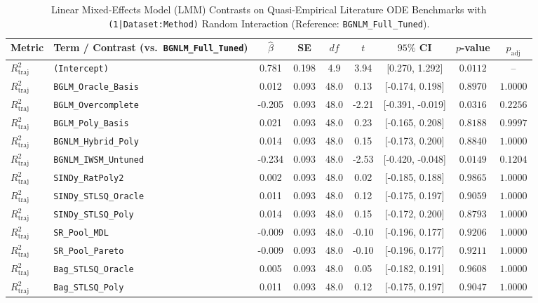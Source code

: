 \begin{table}[t]
\centering
\caption{Linear Mixed-Effects Model (LMM) Contrasts on Quasi-Empirical Literature ODE Benchmarks with \texttt{(1|Dataset:Method)} Random Interaction (Reference: \texttt{BGNLM\_Full\_Tuned}).}
\label{tab:mixed_effects_real}
\scriptsize
\setlength{\tabcolsep}{3.5pt}
\renewcommand{\arraystretch}{0.88}
\begin{tabular}{llccccccc}
\toprule
Metric & Term / Contrast (vs.\ \texttt{BGNLM\_Full\_Tuned}) & $\hat{\beta}$ & SE & $df$ & $t$ & $95\%$ CI & $p$-value & $p_{\text{adj}}$ \\
\midrule
$R^2_{\text{traj}}$ & \texttt{(Intercept)} & 0.781 & 0.198 & 4.9 & 3.94 & [0.270, 1.292] & $0.0112$ & -- \\
$R^2_{\text{traj}}$ & \texttt{BGLM\_Oracle\_Basis} & 0.012 & 0.093 & 48.0 & 0.13 & [-0.174, 0.198] & $0.8970$ & $1.0000$ \\
$R^2_{\text{traj}}$ & \texttt{BGLM\_Overcomplete} & -0.205 & 0.093 & 48.0 & -2.21 & [-0.391, -0.019] & $0.0316$ & $0.2256$ \\
$R^2_{\text{traj}}$ & \texttt{BGLM\_Poly\_Basis} & 0.021 & 0.093 & 48.0 & 0.23 & [-0.165, 0.208] & $0.8188$ & $0.9997$ \\
$R^2_{\text{traj}}$ & \texttt{BGNLM\_Hybrid\_Poly} & 0.014 & 0.093 & 48.0 & 0.15 & [-0.173, 0.200] & $0.8840$ & $1.0000$ \\
$R^2_{\text{traj}}$ & \texttt{BGNLM\_IWSM\_Untuned} & -0.234 & 0.093 & 48.0 & -2.53 & [-0.420, -0.048] & $0.0149$ & $0.1204$ \\
$R^2_{\text{traj}}$ & \texttt{SINDy\_RatPoly2} & 0.002 & 0.093 & 48.0 & 0.02 & [-0.185, 0.188] & $0.9865$ & $1.0000$ \\
$R^2_{\text{traj}}$ & \texttt{SINDy\_STLSQ\_Oracle} & 0.011 & 0.093 & 48.0 & 0.12 & [-0.175, 0.197] & $0.9059$ & $1.0000$ \\
$R^2_{\text{traj}}$ & \texttt{SINDy\_STLSQ\_Poly} & 0.014 & 0.093 & 48.0 & 0.15 & [-0.172, 0.200] & $0.8793$ & $1.0000$ \\
$R^2_{\text{traj}}$ & \texttt{SR\_Pool\_MDL} & -0.009 & 0.093 & 48.0 & -0.10 & [-0.196, 0.177] & $0.9206$ & $1.0000$ \\
$R^2_{\text{traj}}$ & \texttt{SR\_Pool\_Pareto} & -0.009 & 0.093 & 48.0 & -0.10 & [-0.196, 0.177] & $0.9211$ & $1.0000$ \\
$R^2_{\text{traj}}$ & \texttt{Bag\_STLSQ\_Oracle} & 0.005 & 0.093 & 48.0 & 0.05 & [-0.182, 0.191] & $0.9608$ & $1.0000$ \\
$R^2_{\text{traj}}$ & \texttt{Bag\_STLSQ\_Poly} & 0.011 & 0.093 & 48.0 & 0.12 & [-0.175, 0.197] & $0.9047$ & $1.0000$ \\

\end{tabular}
\end{table}
